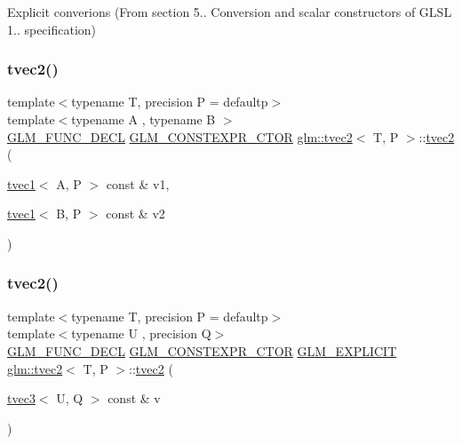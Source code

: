 Explicit converions (From section 5.. Conversion and scalar constructors of G\+L\+SL 1.. specification) 

\mbox{\label{structglm_1_1tvec2_a6284a7d6b9a31303f992b42894d47db7}} 
\subsubsection{\texorpdfstring{tvec2()}{tvec2()}\hspace{0.1cm}{\footnotesize\ttfamily [8/17]}}
{\footnotesize\ttfamily template$<$typename T, precision P = defaultp$>$ \\
template$<$typename A , typename B $>$ \\
\mbox{\hyperlink{setup_8hpp_ab2d052de21a70539923e9bcbf6e83a51}{G\+L\+M\+\_\+\+F\+U\+N\+C\+\_\+\+D\+E\+CL}} \mbox{\hyperlink{setup_8hpp_ad34178a09666081abdb573c14d1f4a5a}{G\+L\+M\+\_\+\+C\+O\+N\+S\+T\+E\+X\+P\+R\+\_\+\+C\+T\+OR}} \mbox{\hyperlink{structglm_1_1tvec2}{glm\+::tvec2}}$<$ T, P $>$\+::\mbox{\hyperlink{structglm_1_1tvec2}{tvec2}} (\begin{DoxyParamCaption}\item[{\mbox{\hyperlink{structglm_1_1tvec1}{tvec1}}$<$ A, P $>$ const \&}]{v1,  }\item[{\mbox{\hyperlink{structglm_1_1tvec1}{tvec1}}$<$ B, P $>$ const \&}]{v2 }\end{DoxyParamCaption})}

\mbox{\label{structglm_1_1tvec2_a230aa7113a4beee76efb778695d009dc}} 
\subsubsection{\texorpdfstring{tvec2()}{tvec2()}\hspace{0.1cm}{\footnotesize\ttfamily [9/17]}}
{\footnotesize\ttfamily template$<$typename T, precision P = defaultp$>$ \\
template$<$typename U , precision Q$>$ \\
\mbox{\hyperlink{setup_8hpp_ab2d052de21a70539923e9bcbf6e83a51}{G\+L\+M\+\_\+\+F\+U\+N\+C\+\_\+\+D\+E\+CL}} \mbox{\hyperlink{setup_8hpp_ad34178a09666081abdb573c14d1f4a5a}{G\+L\+M\+\_\+\+C\+O\+N\+S\+T\+E\+X\+P\+R\+\_\+\+C\+T\+OR}} \mbox{\hyperlink{setup_8hpp_a6c74f5a5e7b134ab69023ff9a30d4d5d}{G\+L\+M\+\_\+\+E\+X\+P\+L\+I\+C\+IT}} \mbox{\hyperlink{structglm_1_1tvec2}{glm\+::tvec2}}$<$ T, P $>$\+::\mbox{\hyperlink{structglm_1_1tvec2}{tvec2}} (\begin{DoxyParamCaption}\item[{\mbox{\hyperlink{structglm_1_1tvec3}{tvec3}}$<$ U, Q $>$ const \&}]{v }\end{DoxyParamCaption})}



